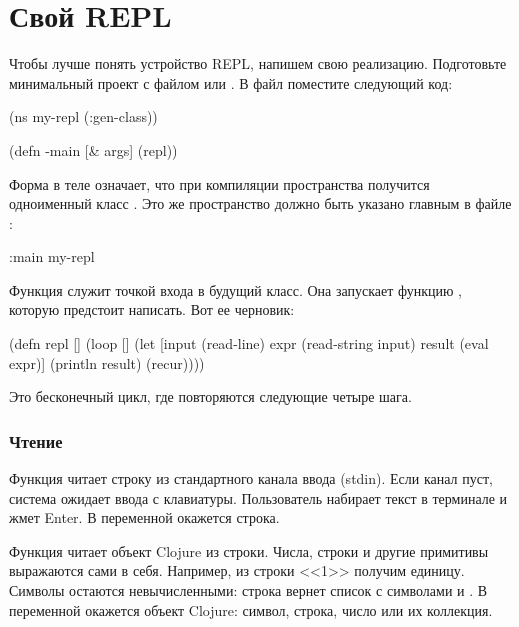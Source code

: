 \section{Свой REPL}

Чтобы лучше понять устройство REPL, напишем свою реализацию. Подготовьте минимальный проект с файлом  или . В файл  поместите следующий код:

\begin{english}
  \begin{clojure/lines}
(ns my-repl
  (:gen-class))

(defn -main [& args]
  (repl))
  \end{clojure/lines}
\end{english}

Форма  в теле  означает, что при компиляции пространства получится одноименный класс . Это же пространство должно быть указано главным в файле :

\begin{english}
  \begin{clojure}
:main my-repl
  \end{clojure}
\end{english}

Функция  служит точкой входа в будущий класс. Она запускает функцию , которую предстоит написать. Вот ее черновик:

\begin{english}
  \begin{clojure}
(defn repl []
  (loop []
    (let [input (read-line)
          expr (read-string input)
          result (eval expr)]
      (println result)
      (recur))))
  \end{clojure}
\end{english}

Это бесконечный цикл, где повторяются следующие четыре шага.

\subsubsection{Чтение}

Функция  читает строку из стандартного канала ввода (stdin). Если канал пуст, система ожидает ввода с клавиатуры. Пользователь набирает текст в терминале и жмет Enter. В переменной  окажется строка.

Функция  читает объект Clojure из строки. Числа, строки и другие примитивы выражаются сами в себя. Например, из строки <<1>> получим единицу. Символы остаются невычисленными: строка  вернет список с символами  и . В переменной  окажется объект Clojure: символ, строка, число или их коллекция.

